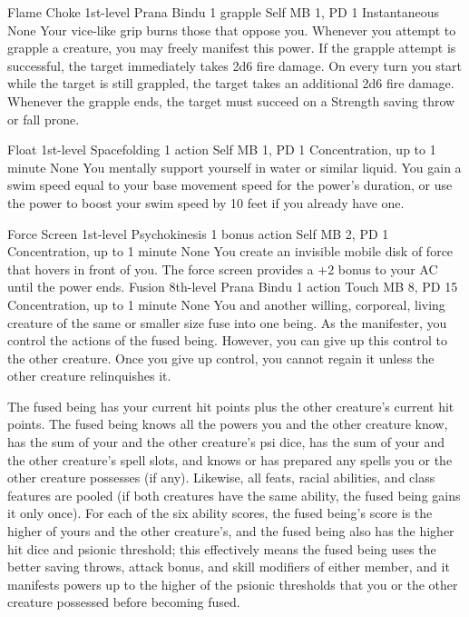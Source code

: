 \DndPowerHeader%
    {Flame Choke\label{pwr:flame_choke}}
    {1st-level Prana Bindu}
    {1 grapple}
    {Self}
    {MB 1, PD 1}
    {Instantaneous}
    {None}
Your vice-like grip burns those that oppose
you. Whenever you attempt to grapple a creature, you may freely
manifest this power. If the grapple attempt
is successful, the target immediately takes 2d6 fire damage.
On every turn you start while the target is still grappled,
the target takes an additional 2d6 fire damage. Whenever the
grapple ends, the target must succeed on a Strength saving
throw or fall prone.

\DndPowerHeader%
    {Float\label{pwr:float}}
    {1st-level Spacefolding}
    {1 action}
    {Self}
    {MB 1, PD 1}
    {Concentration, up to 1 minute}
    {None}
You mentally support yourself in water or
similar liquid. You gain a swim speed equal to your base movement
speed for the power's duration, or use the power to boost
your swim speed by 10 feet if you already have one.

\DndPowerHeader%
    {Force Screen\label{pwr:force_screen}}
    {1st-level Psychokinesis}
    {1 bonus action}
    {Self}
    {MB 2, PD 1}
    {Concentration, up to 1 minute}
    {None}
You create an invisible mobile disk of force
that hovers in front of you. The force screen provides a +2
bonus to your AC until the power ends.
\DndPowerHeader%
    {Fusion\label{pwr:fusion}}
    {8th-level Prana Bindu}
    {1 action}
    {Touch}
    {MB 8, PD 15}
    {Concentration, up to 1 minute}
    {None}
You and another willing, corporeal, living
creature of the same or smaller size fuse into one being.
As the manifester, you control the actions of the fused being.
However, you can give up this control to the other creature.
Once you give up control, you cannot regain it unless the
other creature relinquishes it.

The fused being has your current hit points plus the other
creature's current hit points. The fused being knows all
the powers you and the other creature know, has the sum of
your and the other creature's psi dice, has the sum of your
and the other creature's spell slots, and knows or has prepared
any spells you or the other creature possesses (if any). Likewise,
all feats, racial abilities, and class features are pooled
(if both creatures have the same ability, the fused being
gains it only once). For each of the six ability scores, the
fused being's score is the higher of yours and the other
creature's, and the fused being also has the higher hit dice
and psionic threshold; this effectively means the fused being
uses the better saving throws, attack bonus, and skill modifiers
of either member, and it manifests powers up to the higher
of the psionic thresholds that you or the other creature possessed
before becoming fused.

